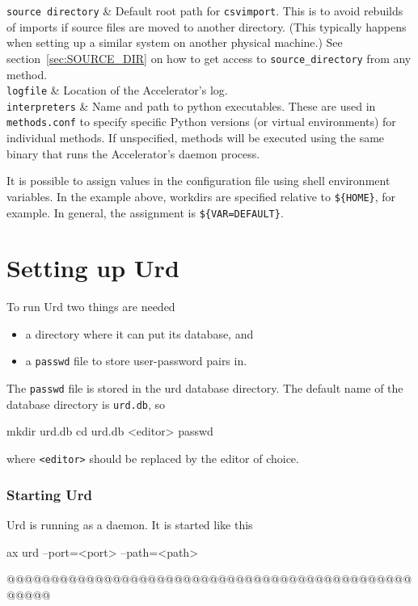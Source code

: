 \RPtwo \texttt{source directory} & Default root path for
\texttt{csvimport}.  This is to avoid rebuilds of imports if source
files are moved to another directory.  (This typically happens when
setting up a similar system on another physical machine.)  See
section~\ref{sec:SOURCE_DIR} on how to get access to
\texttt{source\_directory} from any method.\\[1ex]

\RPtwo \texttt{logfile} & Location of the Accelerator's log.\\[1ex]

\RPtwo \texttt{interpreters} & Name and path to python executables.
These are used in \texttt{methods.conf} to specify specific Python
versions (or virtual environments) for individual methods.  If
unspecified, methods will be executed using the same binary that runs
the Accelerator's daemon process.\\[1ex]

\stoptabletwo

It is possible to assign values in the configuration file using shell
environment variables.  In the example above, workdirs are specified
relative to \texttt{\$\{HOME\}}, for example.  In general, the
assignment is \texttt{\$\{VAR=DEFAULT\}}.



\section{Setting up Urd}
\label{sec:urd_setup}

To run Urd two things are needed
\begin{itemize}
\item[] a directory where it can put its database, and
\item[] a \texttt{passwd} file to store user-password pairs in.
\end{itemize}
The \texttt{passwd} file is stored in the urd database directory.  The
default name of the database directory is \texttt{urd.db}, so
\begin{shell}
mkdir urd.db
cd urd.db
<editor> passwd
\end{shell}
where \texttt{<editor>} should be replaced by the editor of choice.


\subsubsection{Starting Urd}
Urd is running as a daemon.  It is started like this
\begin{shell}
ax urd --port=<port> --path=<path>
\end{shell}
@@@@@@@@@@@@@@@@@@@@@@@@@@@@@@@@@@@@@@@@@@@@@@@@@@@


